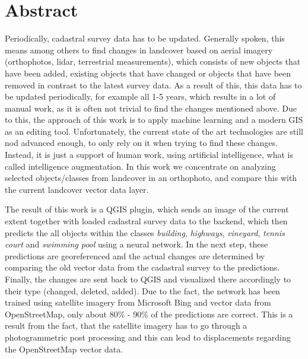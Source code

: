 \cleardoublepage
\markleft{\abstractname}

\chapter*{Abstract}
Periodically, cadastral survey data has to be updated. Generally spoken, this means among others to find changes in landcover based on aerial imagery (orthophotos, lidar, terrestrial measurements), which consists of new objects that have been added, existing objects that have changed or objects that have been removed in contrast to the latest survey data. As a result of this, this data has to be updated periodically, for example all 1-5 years, which results in a lot of manual work, as it is often not trivial to find the changes mentioned above. Due to this, the approach of this work is to apply machine learning and a modern GIS as an editing tool. Unfortunately, the current state of the art technologies are still nod advanced enough, to only rely on it when trying to find these changes. Instead, it is just a support of human work, using artificial intelligence, what is called intelligence augmentation. In this work we concentrate on analyzing selected objects/classes from landcover in an orthophoto, and compare this with the current landcover vector data layer.

The result of this work is a QGIS plugin, which sends an image of the current extent together with loaded cadastral survey data to the backend, which then predicts the all objects within the classes \textit{building}, \textit{highways}, \textit{vineyard}, \textit{tennis court} and \textit{swimming pool} using a neural network. In the next step, these predictions are georeferenced and the actual changes are determined by comparing the old vector data from the cadastral survey to the predictions. Finally, the changes are sent back to QGIS and visualized there accordingly to their type (changed, deleted, added). Due to the fact, the network has been trained using satellite imagery from Microsoft Bing and vector data from OpenStreetMap, only about 80\% - 90\% of the predictions are correct. This is a result from the fact, that the satellite imagery has to go through a photogrammetric post processing and this can lead to displacements regarding the OpenStreetMap vector data.